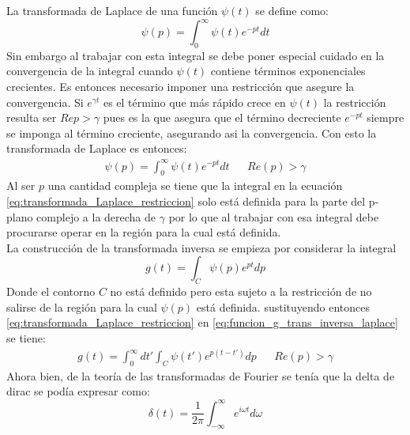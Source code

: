 \documentclass[../tesis_main_file.tex]{subfiles}
\begin{document}
\onlyinsubfile{\appendix}
\onlyinsubfile{\setcounter{chapter}{1}}
La transformada de Laplace de una función $\psi (t)$ se define como:
\begin{equation}
\label{eq:def_transformada_Laplace}
\psi (p) = \int^{\infty}_0 \psi (t) e^{-pt}dt
\end{equation}
Sin embargo al trabajar con esta integral se debe poner especial cuidado en la convergencia de la integral cuando $\psi (t)$ contiene términos exponenciales crecientes.
Es entonces necesario imponer una restricción que asegure la convergencia. Si $e^{\gamma t}$ es el término que más rápido crece en $\psi (t)$ la restricción resulta ser $Re p > \gamma$ pues es la que asegura que el término decreciente $e ^{-pt}$ siempre se imponga al término creciente, asegurando asi la convergencia. Con esto la transformada de Laplace es entonces:
\begin{align}
\label{eq:transformada_Laplace_restriccion}
\psi (p) = \int^{\infty}_0 \psi (t) e^{-pt}dt && Re (p) > \gamma
\end{align}
Al ser $p$ una cantidad compleja se tiene que la integral en la ecuación \ref{eq:transformada_Laplace_restriccion} solo está definida para la parte del p-plano complejo a la derecha de $\gamma$ por lo que al trabajar con esa integral debe procurarse operar en la región para la cual está definida.\\
La construcción de la transformada inversa se empieza por considerar la integral
\begin{equation}
\label{eq:funcion_g_trans_inversa_laplace}
g(t) = \int _C \psi(p)e^{pt}dp
\end{equation}
Donde el contorno $C$ no está definido pero esta sujeto a la restricción de no salirse de la región para la cual $\psi (p)$ está definida. sustituyendo entonces \ref{eq:transformada_Laplace_restriccion} en \ref{eq:funcion_g_trans_inversa_laplace} se tiene:
\begin{align}
\label{eq:funcion_g_sustitucion}
g(t) = \int ^{\infty}_0dt'\int _C \psi (t')e^{p(t-t')}dp & & Re(p) > \gamma
\end{align}
Ahora bien, de la teoría de las transformadas de Fourier se tenía que la delta de dirac se podía expresar como:
\begin{equation}
\label{eq:delta_fourier}
\delta(t) =\frac{1}{2\pi}\int ^{\infty}_{- \infty} e^{i \omega t} d \omega
\end{equation}
\end{document}

